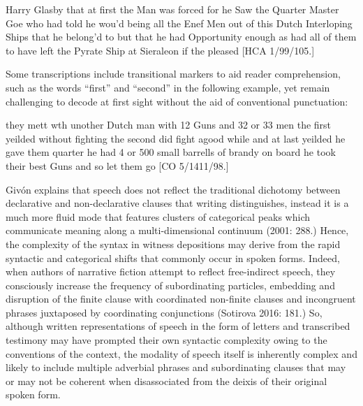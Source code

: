 \begin{styleStandard}
Harry Glasby that at first the Man was forced for he Saw the Quarter Master Goe who had told he wou’d being all the Enef Men out of this Dutch Interloping Ships that he belong’d to but that he had Opportunity enough as had all of them to have left the Pyrate Ship at Sieraleon if the pleased [HCA 1/99/105.]
\end{styleStandard}

\begin{styleStandard}
Some transcriptions include transitional markers to aid reader comprehension, such as the words “first” and “second” in the following example, yet remain challenging to decode at first sight without the aid of conventional punctuation: 
\end{styleStandard}

\begin{styleStandard}
they mett wth unother Dutch man with 12 Guns and 32 or 33 men the first yeilded without fighting the second did fight agood while and at last yeilded he gave them quarter he had 4 or 500 small barrells of brandy on board he took their best Guns and so let them go [CO 5/1411/98.]
\end{styleStandard}

\begin{styleStandard}
Givón explains that speech does not reflect the traditional dichotomy between declarative and non-declarative clauses that writing distinguishes, instead it is a much more fluid mode that features clusters of categorical peaks which communicate meaning along a multi-dimensional continuum (2001: 288.) Hence, the complexity of the syntax in witness depositions may derive from the rapid syntactic and categorical shifts that commonly occur in spoken forms. Indeed, when authors of narrative fiction attempt to reflect free-indirect speech, they consciously increase the frequency of subordinating particles, embedding and disruption of the finite clause with coordinated non-finite clauses and incongruent phrases juxtaposed by coordinating conjunctions (Sotirova 2016: 181.) So, although written representations of speech in the form of letters and transcribed testimony may have prompted their own syntactic complexity owing to the conventions of the context, the modality of speech itself is inherently complex and likely to include multiple adverbial phrases and subordinating clauses that may or may not be coherent when disassociated from the deixis of their original spoken form. \ \ 
\end{styleStandard}

